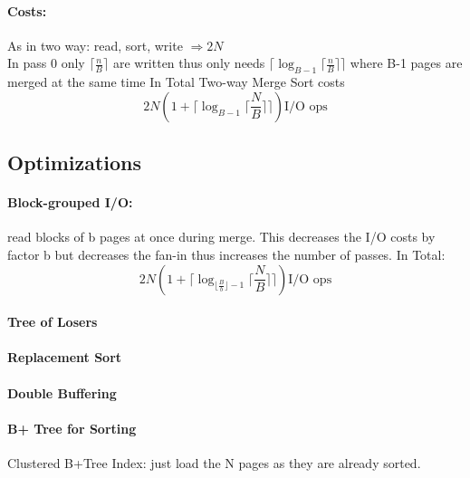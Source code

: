  \paragraph{Costs:} As in two way: read, sort, write $\Rightarrow 2N$ \\
 In pass 0 only $\lceil \frac{n}{B}\rceil$ are written thus only needs $\lceil \log_{B-1} \lceil \frac{n}{B}\rceil\rceil$ where B-1 pages are merged at the same time
 In Total Two-way Merge Sort costs \[ 2 N (1+ \lceil \log_{B-1} \lceil \frac{N}{B}\rceil\rceil) \text{I/O ops}\]
 
 \subsection{Optimizations}
 \paragraph{Block-grouped I/O:} read blocks of b pages at once during merge. This decreases the I/O costs by factor b but decreases the fan-in thus increases the number of passes. In Total:
 \[ 2 N (1+ \lceil \log_{\lfloor \frac{B}{b}\rfloor-1} \lceil \frac{N}{B}\rceil\rceil) \text{I/O ops}\]
 
 
 \paragraph{Tree of Losers}
 
 \paragraph{Replacement Sort}
 
 \paragraph{Double Buffering}
 
 \paragraph{B+ Tree for Sorting}
 Clustered B+Tree Index: just load the N pages as they are already sorted. \\
 
